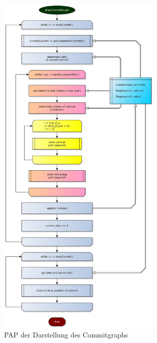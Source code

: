 \documentclass[color, ddc]{tudscrreprt}
\begin{document}
\begin{figure}[ht!]
\centering
\includegraphics[width=0.7\textwidth]{Skizzen/PAP_gesamt.jpg}
\caption{PAP der Darstellung des Commitgraphs}
\label{pap-img}
\end{figure}
\end{document}
